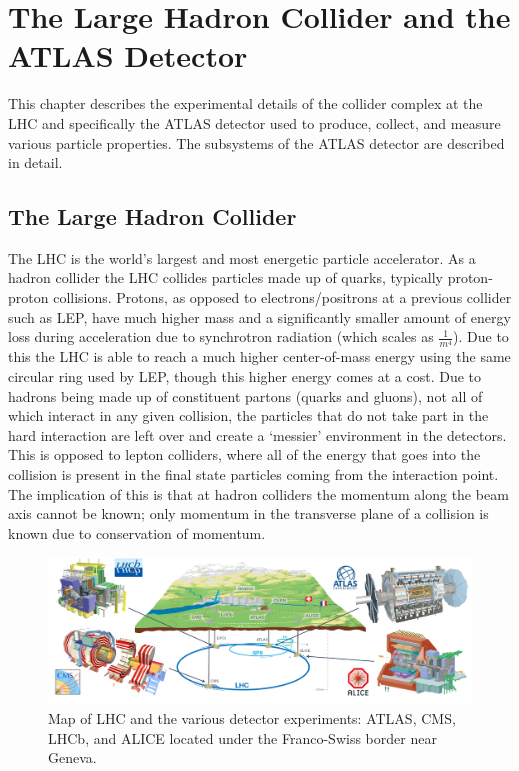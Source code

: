 
\chapter{The Large Hadron Collider and the ATLAS Detector}
\label{ch:LHCDetector}

This chapter describes the experimental details of the collider complex at the LHC and specifically the ATLAS detector used to produce, collect, and measure various particle properties.  The subsystems of the ATLAS detector are described in detail.
\section{The Large Hadron Collider}
\label{Section:LHC}
The LHC is the world's largest and most energetic particle accelerator.  As a hadron collider the LHC collides particles made up of quarks, typically proton-proton collisions.  Protons, as opposed to electrons/positrons at a previous collider such as LEP, have much higher mass and a significantly smaller amount of energy loss during acceleration due to synchrotron radiation (which scales as $\frac{1}{m^4}$).  Due to this the LHC is able to reach a much higher center-of-mass energy using the same circular ring used by LEP, though this higher energy comes at a cost.  Due to hadrons being made up of constituent partons (quarks and gluons), not all of which interact in any given collision, the particles that do not take part in the hard interaction are left over and create a `messier' environment in the detectors.  This is opposed to lepton colliders, where all of the energy that goes into the collision is present in the final state particles coming from the interaction point.  The implication of this is that at hadron colliders the momentum along the beam axis cannot be known; only momentum in the transverse plane of a collision is known due to conservation of momentum.

\begin{figure}[ht!]
	\centering
	\includegraphics[width=\columnwidth]{../ThesisImages/LHCImages/LHCDetecPlacement.png}
	\caption[Map of LHC and the various detector experiments: ATLAS, CMS, LHCb, and ALICE located under the Franco-Swiss border near Geneva.]{Map of LHC and the various detector experiments: ATLAS, CMS, LHCb, and ALICE  located under the Franco-Swiss border near Geneva\cite{ATLASCoords}.}
	\label{fig:LHCDetPlace}
\end{figure}

